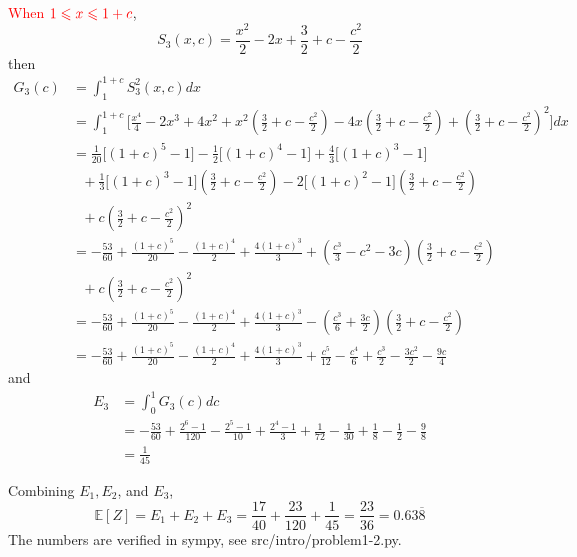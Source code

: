 \documentclass[12pt]{simple_doc}
\begin{document}
    \textcolor{red}{When} $\color{red} 1 \leqslant x \leqslant 1 + c$,
    \begin{equation*}
        S_3(x, c) = \frac{x^2}{2} - 2x + \frac{3}{2} + c - \frac{c^2}{2}
    \end{equation*}
    then
    \begin{equation*}
		\begin{aligned}
		G_3(c) &= \int_1^{1+c} S_3^2(x, c) dx \\
		   &= \int_1^{1+c} \Big[\frac{x^4}{4} - 2x^3 + 4x^2 + x^2(\frac{3}{2} + c - \frac{c^2}{2})
              -4x(\frac{3}{2} + c - \frac{c^2}{2}) + (\frac{3}{2} + c - \frac{c^2}{2})^2\Big] dx\\
           &= \frac{1}{20}\big[(1+c)^5 - 1\big] - \frac{1}{2}\big[(1+c)^4 - 1\big] + \frac{4}{3}\big[(1+c)^3 - 1\big]\\
           &\ \ \ + \frac{1}{3}\big[(1+c)^3 - 1\big](\frac{3}{2} + c - \frac{c^2}{2})
              - 2\big[(1+c)^2 - 1\big](\frac{3}{2} + c - \frac{c^2}{2})\\
           &\ \ \ + c(\frac{3}{2} + c - \frac{c^2}{2})^2\\
           &= -\frac{53}{60} + \frac{(1+c)^5}{20} - \frac{(1+c)^4}{2} + \frac{4(1+c)^3}{3}
              + (\frac{c^3}{3} - c^2 -3c)(\frac{3}{2} + c - \frac{c^2}{2})\\
           &\ \ \ + c(\frac{3}{2} + c - \frac{c^2}{2})^2\\
           &= -\frac{53}{60} + \frac{(1+c)^5}{20} - \frac{(1+c)^4}{2} + \frac{4(1+c)^3}{3}
              - (\frac{c^3}{6} + \frac{3c}{2})(\frac{3}{2} + c - \frac{c^2}{2})\\
           &= -\frac{53}{60} + \frac{(1+c)^5}{20} - \frac{(1+c)^4}{2} + \frac{4(1+c)^3}{3}
              + \frac{c^5}{12} - \frac{c^4}{6} + \frac{c^3}{2} - \frac{3c^2}{2} - \frac{9c}{4}
		\end{aligned}
	\end{equation*}
    and
    \begin{equation*}
		\begin{aligned}
		E_3 &= \int_0^1 G_3(c) dc \\
		   &= -\frac{53}{60} + \frac{2^6-1}{120} - \frac{2^5-1}{10} + \frac{2^4-1}{3}
                + \frac{1}{72} - \frac{1}{30} + \frac{1}{8} - \frac{1}{2} - \frac{9}{8} \\
           &= \frac{1}{45}
		\end{aligned}
	\end{equation*}

    Combining $E_1, E_2$, and $E_3$,
    \begin{equation*}
        \mathbb{E}[Z] = E_1 + E_2 + E_3 = \frac{17}{40} + \frac{23}{120} + \frac{1}{45}
                      = \frac{23}{36} = 0.63\overline{8}
    \end{equation*}
    The numbers are verified in sympy, see src/intro/problem1-2.py.
\end{document}
